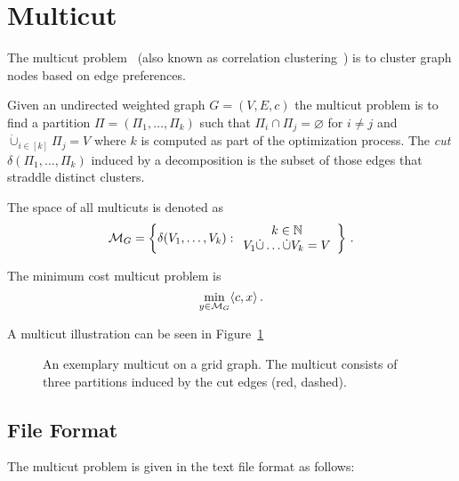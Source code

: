 \section{Multicut}
\label{sec:multicut}

The multicut problem~\cite{chopra1993partition} (also known as correlation clustering~\cite{demaine2006correlation}) is to cluster graph nodes based on edge preferences.

\begin{definition}[Multicut]
Given an undirected weighted graph $G=(V,E,c)$ the multicut problem is to find a partition $\Pi = (\Pi_1,\ldots,\Pi_k)$ such that $\Pi_i \cap \Pi_j = \varnothing$ for $i \neq j$ and $\dot{\cup}_{i\in[k]} \Pi_j = V$ where $k$ is computed as part of the optimization process.
The \emph{cut} $\delta(\Pi_1,\ldots,\Pi_k)$ induced by a decomposition is the subset of those edges that straddle distinct clusters.

The space of all multicuts is denoted as
\begin{equation}
  \mathcal{M}_G = \left\{ \delta(V_1,\ldots,V_k) : 
\begin{array}{c}
  k \in \mathbb{N} \\
  V_1 \dot\cup \ldots \dot\cup V_k = V
\end{array} \right\}\,.
\end{equation} 

The minimum cost multicut problem is
\begin{equation}
  \label{eq:multicut}
  \min_{y \in \mathcal{M}_G} \langle c, x \rangle\,.
\end{equation} 
\end{definition}

A multicut illustration can be seen in Figure~\ref{fig:multicut-illustration}

\begin{figure}[H]
    \centering
    \scalebox{0.7}{  }
    \caption{
    An exemplary multicut on a grid graph.
    The multicut consists of three partitions induced by the cut edges (red, dashed).
    }
    \label{fig:multicut-illustration}
\end{figure}

\subsection{File Format}
The multicut problem is given in the text file format as follows:

